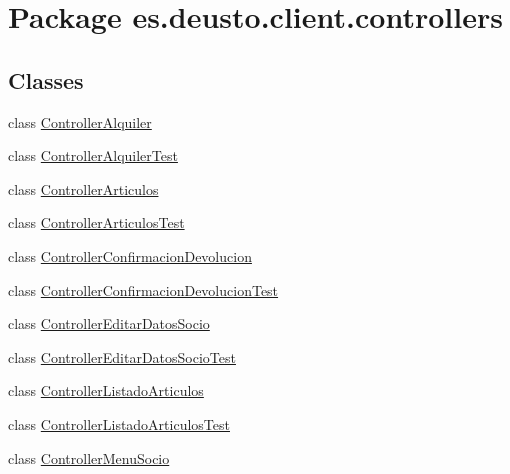 \hypertarget{namespacees_1_1deusto_1_1client_1_1controllers}{}\section{Package es.\+deusto.\+client.\+controllers}
\label{namespacees_1_1deusto_1_1client_1_1controllers}
\subsection*{Classes}
\begin{DoxyCompactItemize}
\item 
class \mbox{\hyperlink{classes_1_1deusto_1_1client_1_1controllers_1_1_controller_alquiler}{Controller\+Alquiler}}
\item 
class \mbox{\hyperlink{classes_1_1deusto_1_1client_1_1controllers_1_1_controller_alquiler_test}{Controller\+Alquiler\+Test}}
\item 
class \mbox{\hyperlink{classes_1_1deusto_1_1client_1_1controllers_1_1_controller_articulos}{Controller\+Articulos}}
\item 
class \mbox{\hyperlink{classes_1_1deusto_1_1client_1_1controllers_1_1_controller_articulos_test}{Controller\+Articulos\+Test}}
\item 
class \mbox{\hyperlink{classes_1_1deusto_1_1client_1_1controllers_1_1_controller_confirmacion_devolucion}{Controller\+Confirmacion\+Devolucion}}
\item 
class \mbox{\hyperlink{classes_1_1deusto_1_1client_1_1controllers_1_1_controller_confirmacion_devolucion_test}{Controller\+Confirmacion\+Devolucion\+Test}}
\item 
class \mbox{\hyperlink{classes_1_1deusto_1_1client_1_1controllers_1_1_controller_editar_datos_socio}{Controller\+Editar\+Datos\+Socio}}
\item 
class \mbox{\hyperlink{classes_1_1deusto_1_1client_1_1controllers_1_1_controller_editar_datos_socio_test}{Controller\+Editar\+Datos\+Socio\+Test}}
\item 
class \mbox{\hyperlink{classes_1_1deusto_1_1client_1_1controllers_1_1_controller_listado_articulos}{Controller\+Listado\+Articulos}}
\item 
class \mbox{\hyperlink{classes_1_1deusto_1_1client_1_1controllers_1_1_controller_listado_articulos_test}{Controller\+Listado\+Articulos\+Test}}
\item 
class \mbox{\hyperlink{classes_1_1deusto_1_1client_1_1controllers_1_1_controller_menu_socio}{Controller\+Menu\+Socio}}

\end{DoxyCompactItemize}

